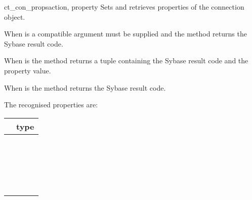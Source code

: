 \begin{methoddesc}[CS_CONNECTION]{ct_con_props}{action, property }
Sets and retrieves properties of the connection object.

When  is  a compatible  argument
must be supplied and the method returns the Sybase result code.

When  is  the method returns a tuple
containing the Sybase result code and the property value.

When  is  the method returns the Sybase
result code.

The recognised properties are:

\begin{longtable}{l|l}
\var{property} & type \\
\hline
\code{CS_ANSI_BINDS}           & \code{bool} \\
\code{CS_ASYNC_NOTIFS}         & \code{bool} \\
\code{CS_BULK_LOGIN}           & \code{bool} \\
\code{CS_CHARSETCNV}           & \code{bool} \\
\code{CS_CONFIG_BY_SERVERNAME} & \code{bool} \\
\code{CS_DIAG_TIMEOUT}         & \code{bool} \\
\code{CS_DISABLE_POLL}         & \code{bool} \\
\code{CS_DS_COPY}              & \code{bool} \\
\code{CS_DS_EXPANDALIAS}       & \code{bool} \\
\code{CS_DS_FAILOVER}          & \code{bool} \\
\code{CS_EXPOSE_FMTS}          & \code{bool} \\
\code{CS_EXTERNAL_CONFIG}      & \code{bool} \\
\code{CS_EXTRA_INF}            & \code{bool} \\
\code{CS_HIDDEN_KEYS}          & \code{bool} \\
\code{CS_LOGIN_STATUS}         & \code{bool} \\
\code{CS_NOCHARSETCNV_REQD}    & \code{bool} \\
\code{CS_SEC_APPDEFINED}       & \code{bool} \\
\code{CS_SEC_CHALLENGE}        & \code{bool} \\
\code{CS_SEC_CHANBIND}         & \code{bool} \\
\code{CS_SEC_CONFIDENTIALITY}  & \code{bool} \\

\end{longtable}
\end{methoddesc}
